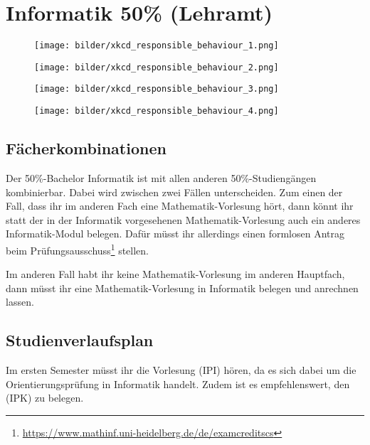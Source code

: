 \section{Informatik 50\% (Lehramt)}

\begin{figure*}[t]
    \centering
    \begin{subfigure}{.24\textwidth}
        \centering
        \texttt{[image: bilder/xkcd\_responsible\_behaviour\_1.png]}
    \end{subfigure}
    \begin{subfigure}{.24\textwidth}
        \centering
        \texttt{[image: bilder/xkcd\_responsible\_behaviour\_2.png]}
    \end{subfigure}
    \begin{subfigure}{.25\textwidth}
        \centering
        \texttt{[image: bilder/xkcd\_responsible\_behaviour\_3.png]}
    \end{subfigure}
    \begin{subfigure}{.25\textwidth}
        \centering
        \texttt{[image: bilder/xkcd\_responsible\_behaviour\_4.png]}
    \end{subfigure}
\end{figure*}

\subsection{Fächerkombinationen}
Der 50\%-Bachelor Informatik ist mit allen anderen 50\%-Studiengängen kombinierbar. Dabei wird zwischen zwei Fällen unterscheiden. Zum einen der Fall, dass ihr im anderen Fach eine Mathematik-Vorlesung hört, dann könnt ihr statt der in der Informatik vorgesehenen Mathematik-Vorlesung auch ein anderes Informatik-Modul belegen. Dafür müsst ihr allerdings einen formlosen Antrag beim Prüfungsausschuss\footnote{\url{https://www.mathinf.uni-heidelberg.de/de/examcreditscs}} stellen.

Im anderen Fall habt ihr keine Mathematik-Vorlesung im anderen Hauptfach, dann müsst ihr eine Mathematik-Vorlesung in Informatik belegen und anrechnen lassen.

\subsection{Studienverlaufsplan}
Im ersten Semester müsst ihr die Vorlesung  (\gls{IPI}) hören, da es sich dabei um die Orientierungsprüfung in Informatik handelt. Zudem ist es empfehlenswert, den  (\gls{IPK}) zu belegen.

